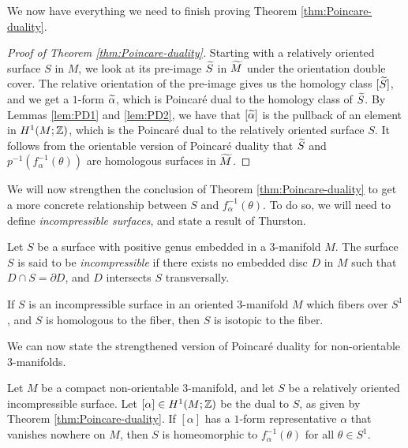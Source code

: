 We now have everything we need to finish proving Theorem \ref{thm:Poincare-duality}.
\begin{proof}[Proof of Theorem \ref{thm:Poincare-duality}]
  Starting with a relatively oriented surface $S$ in $M$, we look at its pre-image $\widetilde{S}$ in $\widetilde{M}$ under the orientation double cover.
  The relative orientation of the pre-image gives us the homology class $[\widetilde{S}]$, and we get a $1$-form $\widetilde{\alpha}$, which is Poincar\'e dual to the homology class of $\widetilde{S}$.
  By Lemmas \ref{lem:PD1} and \ref{lem:PD2}, we have that $[\widetilde{\alpha}]$ is the pullback of an element in $H^1(M; \mathbb{Z})$, which is the Poincar\'e dual to the relatively oriented surface $S$.
  It follows from the orientable version of Poincar\'e duality that $\widetilde{S}$ and $p^{-1}(f_{\alpha}^{-1}(\theta))$ are homologous surfaces in $\widetilde{M}$.
\end{proof}

We will now strengthen the conclusion of Theorem \ref{thm:Poincare-duality} to get a more concrete relationship between $S$ and $f_{\alpha}^{-1}(\theta)$.
To do so, we will need to define \emph{incompressible surfaces}, and state a result of Thurston.

\begin{defn}
  Let $S$ be a surface with positive genus embedded in a $3$-manifold $M$.
  The surface $S$ is said to be \emph{incompressible} if there exists no embedded disc $D$ in $M$ such that $D \cap S = \partial D$, and $D$ intersects $S$ transversally.
\end{defn}

\begin{thm}
  \label{thm:Thur2}
If $S$ is an incompressible surface in an oriented $3$-manifold $M$ which fibers over $S^1$, and $S$ is homologous to the fiber, then $S$ is isotopic to the fiber.
\end{thm}

We can now state the strengthened version of Poincar\'e duality for non-orientable $3$-manifolds.
\begin{thm}
  \label{thm:strong-duality}
  Let $M$ be a compact non-orientable $3$-manifold, and let $S$ be a relatively oriented incompressible surface.
  Let $[\alpha] \in H^1(M; \mathbb{Z})$ be the dual to $S$, as given by Theorem \ref{thm:Poincare-duality}.
  If $[\alpha]$ has a $1$-form representative $\alpha$ that vanishes nowhere on $M$, then $S$ is homeomorphic to $f_{\alpha}^{-1}(\theta)$ for all $\theta \in S^1$.
\end{thm}

